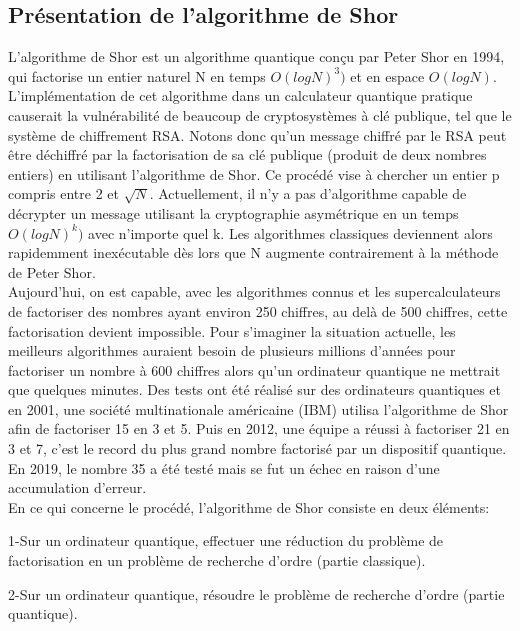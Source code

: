 \documentclass[12pt]{article}
\begin{document}
\subsection{Présentation de l'algorithme de Shor}
L'algorithme de Shor est un algorithme quantique conçu par Peter Shor en 1994, qui factorise un entier naturel N en temps $O(log N)^3)$ et en espace $O(log N)$.
L'implémentation de cet algorithme dans un calculateur quantique pratique causerait la vulnérabilité de beaucoup de cryptosystèmes à clé publique, tel que le système de chiffrement RSA. Notons donc qu'un message chiffré par le RSA peut être déchiffré par la factorisation de sa clé publique (produit de deux nombres entiers) en utilisant l'algorithme de Shor. Ce procédé vise à chercher un entier p compris entre 2 et $\sqrt{N}$. Actuellement, il n'y a pas d'algorithme capable de décrypter un message utilisant la cryptographie asymétrique en un temps $O(log N)^k)$ avec n'importe quel k. Les algorithmes classiques deviennent alors rapidemment inexécutable dès lors que N augmente contrairement à la méthode de Peter Shor.
\\
Aujourd'hui, on est capable, avec les algorithmes connus et les supercalculateurs de factoriser des nombres ayant environ 250 chiffres, au delà de 500 chiffres, cette factorisation devient impossible. Pour s'imaginer la situation actuelle, les meilleurs algorithmes auraient besoin de plusieurs millions d'années pour factoriser un nombre à 600 chiffres alors qu'un ordinateur quantique ne mettrait que quelques minutes. Des tests ont été réalisé sur des ordinateurs quantiques et en 2001, une société multinationale américaine (IBM) utilisa l'algorithme de Shor afin de factoriser 15 en 3 et 5. Puis en 2012, une équipe a réussi à factoriser 21 en 3 et 7, c'est le record du plus grand nombre factorisé par un dispositif quantique. En 2019, le nombre 35 a été testé mais se fut un échec en raison d'une accumulation d'erreur.
\\
En ce qui concerne le procédé, l'algorithme de Shor consiste en deux éléments:

1-Sur un ordinateur quantique, effectuer une réduction du problème de factorisation en un problème de recherche d'ordre (partie classique).

2-Sur un ordinateur quantique, résoudre le problème de recherche d'ordre (partie quantique).
\end{document}
